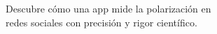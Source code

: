 \documentclass[preview]{standalone}
\begin{document}
\begin{center}
Descubre cómo una app mide la polarización en\\redes sociales con precisión y rigor científico.
\end{center}
\end{document}
